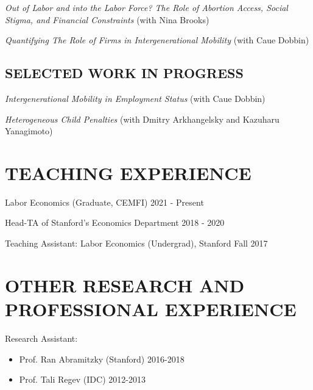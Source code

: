 \documentclass[margin]{res} %
\newcommand{\rootFolder}{/Users/tomzohar/Dropbox/}
\begin{document}
\begin{resume}
\textit{Out of Labor and into the Labor Force? The Role of Abortion Access, Social Stigma, and Financial Constraints} (with Nina Brooks) 

%

\textit{Quantifying The Role of Firms in Intergenerational Mobility} (with Caue Dobbin) 

\subsection{SELECTED WORK IN PROGRESS}

\textit{Intergenerational Mobility in Employment Status} (with Caue Dobbin) 

\textit{Heterogeneous Child Penalties} (with Dmitry Arkhangelsky and Kazuharu Yanagimoto)





\section{TEACHING EXPERIENCE}

Labor Economics (Graduate, CEMFI) \hfill 2021 - Present

Head-TA of Stanford's Economics Department \hfill 2018 - 2020

Teaching Assistant: Labor Economics (Undergrad), Stanford \hfill Fall 2017

 
\section{OTHER RESEARCH AND PROFESSIONAL EXPERIENCE}
 Research Assistant:
\begin{itemize}
	\item Prof. Ran Abramitzky (Stanford) \hfill 2016-2018
	\item Prof. Tali Regev (IDC) \hfill 2012-2013
\end{itemize}
 

\end{resume}
\end{document}
